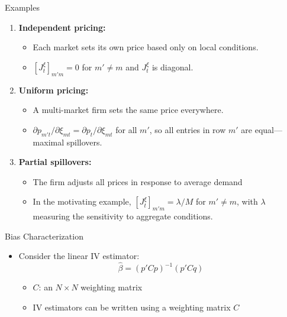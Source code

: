 \documentclass[notes,11pt, aspectratio=169]{beamer}
\begin{document}
\begin{frame}{Examples}

\begin{enumerate}
    \item \textbf{Independent pricing:} 
    \begin{itemize}
        \item Each market sets its own price based only on local conditions.  
        \item $[J_t^\xi]_{m'm} = 0$ for $m' \neq m$ and $J_t^\xi$ is diagonal.
    \end{itemize}

    \item \textbf{Uniform pricing:} 
    \begin{itemize}
        \item A multi-market firm sets the same price everywhere. \item $\partial p_{m't}/\partial \xi_{mt} = \partial p_t/\partial \xi_{mt}$ for all $m'$, so all entries in row $m'$ are equal—maximal spillovers.
    \end{itemize}

    \item \textbf{Partial spillovers:} 
    \begin{itemize}
        \item The firm adjusts all prices in response to average demand 
        \item In the motivating example, $[J_t^\xi]_{m'm} = \lambda/M$ for $m' \neq m$, with $\lambda$ measuring the sensitivity to aggregate conditions.
    \end{itemize}
\end{enumerate}
    
\end{frame}

\begin{frame}{Bias Characterization}

\begin{itemize}
    \item Consider the linear IV estimator: 
    \[
    \widehat{\beta} = (p'Cp)^{-1}(p'Cq)
    \]

\begin{itemize}
    \item $C$: an $N \times N$ weighting matrix
    \item IV estimators can be written using a weighting matrix $C$
\end{itemize}

\end{itemize}

\end{frame}
\end{document}
